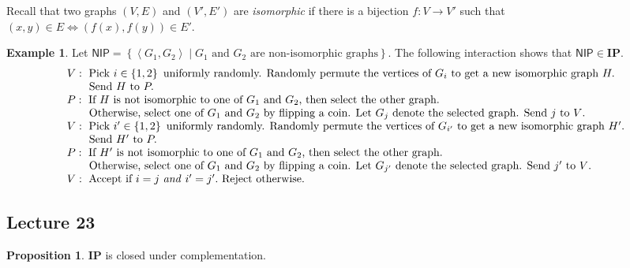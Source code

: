 \documentclass[10pt,letterpaper,cm]{nupset}
\theoremstyle{definition}
\newtheorem{exmp}[definition]{Example}
\theoremstyle{theorem}
\newtheorem{prop}[definition]{Proposition}
\theoremstyle{remark}
\newcommand{\1}{\mathbf{1}}
\newcommand{\0}{\vec 0}
\begin{document}
\smallskip

Recall that two graphs $\left(V, E\right)$ and $\left(V', E'\right)$ are \textit{isomorphic} if there is a bijection $f: V \to V'$ such that $\left(x,y\right) \in E \iff \left(f(x), f(y)\right)\in E'$.

\begin{exmp}
Let $\mathsf{NIP}=  \left\{ \left\langle G_1, G_2 \right\rangle \mid G_1 \text{ and }G_2 \text{ are non-isomorphic graphs}\right\}$. The following interaction shows that $\mathsf{NIP} \in \mathbf{IP}$.
\[
\begin{array}{l}{V : \text { Pick } i \in \left\{1,2\right\} \text { uniformly randomly. Randomly permute the vertices of } G_{i} \text { to get a  new isomorphic graph } H .} \\ {\text {\quad \quad Send } H \text { to } P .} \\ {P : \text { If } H \text { is not isomorphic to one of } G_1 \text{ and } G_2 \text {, then select the other graph. }} \\ {
\text {\quad \quad Otherwise, select one of } G_1 \text{ and } G_2 \text { by flipping a coin. Let } G_j \text{ denote the selected graph. Send } j \text { to } V \text {. }} \\
{V : \text { Pick } i' \in \left\{1,2\right\} \text { uniformly randomly. Randomly permute the vertices of } G_{i'} \text { to get a new isomorphic graph } H' .} \\ { \text {\quad \quad Send } H' \text { to } P .} \\ {P : \text { If } H' \text { is not isomorphic to one of } G_1 \text{ and } G_2 \text {, then select the other graph. }} \\ {
\text {\quad \quad Otherwise, select one of } G_1 \text{ and } G_2 \text { by flipping a coin. Let } G_{j'} \text{ denote the selected graph. Send } j' \text { to } V \text {. }}
\\ {V : \text { Accept if } i=j \text{ \emph{and} } i' =j'. \text { Reject otherwise. }}\end{array}
\] 
\end{exmp}

\subsection{Lecture 23}

\begin{prop}
$\mathbf{IP}$ is closed under complementation. 
\end{prop}
\end{document}
